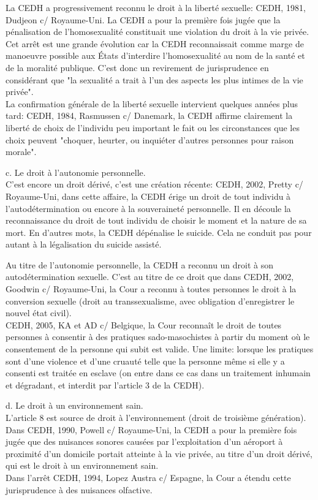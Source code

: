 \documentclass[10pt, a4paper, openany]{book}
\begin{document}
La CEDH a progressivement reconnu le droit à la liberté sexuelle: CEDH, 1981, Dudjeon c/ Royaume-Uni. La CEDH a pour la première fois jugée que la pénalisation de l'homosexualité constituait une violation du droit à la vie privée. Cet arrêt est une grande évolution car la CEDH reconnaissait comme marge de manoeuvre possible aux États d'interdire l'homosexualité au nom de la santé et de la moralité publique. C'est donc un revirement de jurisprudence en considérant que "la sexualité a trait à l'un des aspects les plus intimes de la vie privée". \\
La confirmation générale de la liberté sexuelle intervient quelques années plus tard: CEDH, 1984, Rasmussen c/ Danemark, la CEDH affirme clairement la liberté de choix de  l'individu peu important le fait ou les circonstances que les choix peuvent "choquer, heurter, ou inquiéter d'autres personnes pour raison morale". 


c. Le droit à l'autonomie personnelle. \\
C'est encore un droit dérivé, c'est une création récente: CEDH, 2002, Pretty c/ Royaume-Uni, dans cette affaire, la CEDH érige un droit de tout individu à l'autodétermination ou encore à la souveraineté personnelle. Il en découle la reconnaissance du droit de tout individu de choisir le moment et la nature de sa mort. En d'autres mots, la CEDH dépénalise le suicide. Cela ne conduit pas pour autant à la légalisation du suicide assisté.


Au titre de l'autonomie personnelle, la CEDH a reconnu un droit à son autodétermination sexuelle. C'est au titre de ce droit que dans CEDH, 2002, Goodwin c/ Royaume-Uni, la Cour a reconnu à toutes personnes le droit à la conversion sexuelle (droit au transsexualisme, avec obligation d'enregistrer le nouvel état civil). \\
CEDH, 2005, KA et AD c/ Belgique, la Cour reconnaît le droit de toutes personnes à consentir à des pratiques sado-masochistes à partir du moment où le consentement de la personne qui subit est valide. Une limite: lorsque les pratiques sont d'une violence et d'une cruauté telle que la personne même si elle y a consenti est traitée en esclave (on entre dans ce cas dans un traitement inhumain et dégradant, et interdit par l'article 3 de la CEDH). 


d. Le droit à un environnement sain. \\
L'article 8 est source de droit à l'environnement (droit de troisième génération). Dans CEDH, 1990, Powell c/ Royaume-Uni, la CEDH a pour la première fois jugée que des nuisances sonores causées par l'exploitation d'un aéroport à proximité d'un domicile portait atteinte à la vie privée, au titre d'un droit dérivé, qui est le droit à un environnement sain. \\
Dans l'arrêt CEDH, 1994, Lopez Austra c/ Espagne, la Cour a étendu cette jurisprudence à des nuisances olfactive.  
\end{document}
